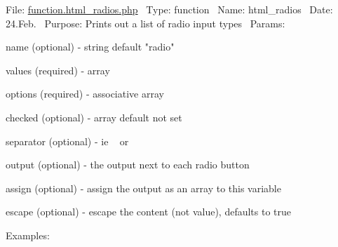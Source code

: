 File\+: \hyperlink{function_8html__radios_8php}{function.\+html\+\_\+radios.\+php}~\newline
 Type\+: function~\newline
 Name\+: html\+\_\+radios~\newline
 Date\+: 24.\+Feb.~\newline
 Purpose\+: Prints out a list of radio input types~\newline
 Params\+: 
\begin{DoxyPre}
\begin{DoxyItemize}
\item name       (optional) - string default "radio"
\item values     (required) - array
\item options    (required) - associative array
\item checked    (optional) - array default not set
\item separator  (optional) - ie ~\newline
 or ~
\item output     (optional) - the output next to each radio button
\item assign     (optional) - assign the output as an array to this variable
\item escape     (optional) - escape the content (not value), defaults to true

Examples:


\end{DoxyItemize}\end{DoxyPre}



